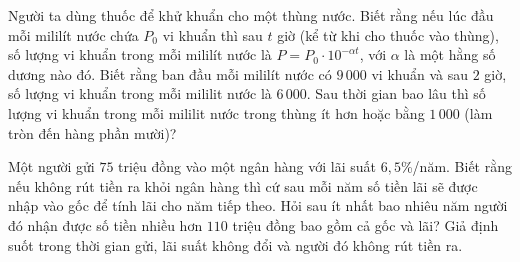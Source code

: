 \begin{bt}%
	Người ta dùng thuốc để khử khuẩn cho một thùng nước. Biết rằng nếu lúc đầu mỗi mililít nước chứa $P_{0}$ vi khuẩn thì sau $t$ giờ (kể từ khi cho thuốc vào thùng), số lượng vi khuẩn trong mỗi mililít nước là $P=P_0 \cdot 10^{-\alpha t}$, với $\alpha$ là một hằng số dương nào đó. Biết rằng ban đầu mỗi mililít nước có $9\,000$ vi khuẩn và sau $2$ giờ, số lượng vi khuẩn trong mỗi mililit nước là $6\,000$. Sau thời gian bao lâu thì số lượng vi khuẩn trong mỗi mililit nước trong thùng ít hơn hoặc bằng $1\,000$ (làm tròn đến hàng phần mười)?
\end{bt}

\begin{bt}%

	Một người gửi $75$ triệu đồng vào một ngân hàng với lãi suất $6{,}5$\%/năm. Biết rằng nếu không rút tiền ra khỏi ngân hàng thì cứ sau mỗi năm số tiền lãi sẽ được nhập vào gốc để tính lãi cho năm tiếp theo. Hỏi sau ít nhất bao nhiêu năm người đó nhận được số tiền nhiều hơn $110$ triệu đồng bao gồm cả gốc và lãi? Giả định suốt trong thời gian gửi, lãi suất không đổi và người đó không rút tiền ra.
	
\end{bt}

